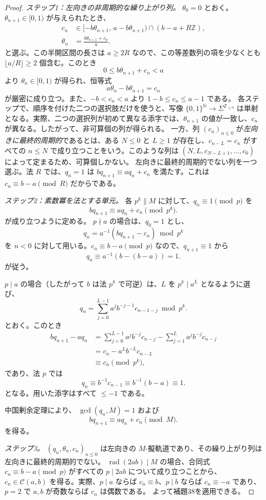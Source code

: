\documentclass[11pt,reqno]{amsart}
\theoremstyle{definition}
\theoremstyle{definition}
\theoremstyle{remark}
\begin{document}
\begin{proof}\leavevmode\label{proof:39}
\emph{ステップ1：左向きの非周期的な繰り上がり列。} \(\theta_0=0\) とおく。\(\theta_{n+1}\in[0,1)\) が与えられたとき、
\[
\begin{aligned}
c_n&\in[-b\theta_{n+1},\,a-b\theta_{n+1})\cap(b-a+R\mathbb Z),\\
\theta_n&=\frac{b\theta_{n+1}+c_n}{a}.
\end{aligned}
\]
と選ぶ。この半開区間の長さは \(a\ge2R\) なので、この等差数列の項を少なくとも \(\lfloor a/R\rfloor\ge2\) 個含む。このとき
\[
0\le b\theta_{n+1}+c_n<a
\]
より \(\theta_n\in[0,1)\) が得られ、恒等式
\[
a\theta_n-b\theta_{n+1}=c_n
\]
が厳密に成り立つ。また、\(-b<c_n<a\) より \(1-b\le c_n\le a-1\) である。
各ステップで、順序を付けた二つの選択肢だけを使うと、写像 \(\{0,1\}^{\mathbb N}\to\Sigma^{\mathbb Z_{\le0}}\) は単射となる。実際、二つの選択列が初めて異なる添字では、\(\theta_{n+1}\) の値が一致し、\(c_n\) が異なる。したがって、非可算個の列が得られる。
一方、列 \((c_n)_{n\le0}\) が\emph{左向きに最終的周期的}であるとは、ある \(N\le0\) と \(L\ge1\) が存在し、\(c_{n-L}=c_n\) がすべての \(n\le N\) で成り立つことをいう。このような列は \((N,L,c_{N-L+1},\ldots,c_0)\) によって定まるため、可算個しかない。
左向きに最終的周期的でない列を一つ選ぶ。法 \(R\) では、\(q_n=1\) は \(bq_{n+1}\equiv aq_n+c_n\) を満たす。これは \(c_n\equiv b-a\pmod R\) だからである。

\emph{ステップ2：素数冪を法とする単元。} 各 \(p^k\parallel M\) に対して、\(q_n\equiv1\pmod p\) を
\[
bq_{n+1}\equiv aq_n+c_n\pmod{p^k}.
\]
が成り立つように定める。
\(p\nmid a\) の場合は、\(q_0=1\) とし、
\[
q_n=a^{-1}(bq_{n+1}-c_n)\bmod p^k
\]
を \(n<0\) に対して用いる。\(c_n\equiv b-a\pmod p\) なので、\(q_{n+1}\equiv1\) から
\[
q_n\equiv a^{-1}(b-(b-a))=1.
\]
が従う。

\(p\mid a\) の場合（したがって \(b\) は法 \(p^k\) で可逆）は、\(L\) を \(p^k\mid a^L\) となるように選び、
\[
q_n=\sum_{j=0}^{L-1}a^jb^{-j-1}c_{n-1-j}\bmod p^k.
\]
とおく。このとき
\[
\begin{aligned}
bq_{n+1}-aq_n&=\sum_{j=0}^{L-1}a^jb^{-j}c_{n-j}-\sum_{j=1}^{L}a^jb^{-j}c_{n-j}\\
&=c_n-a^Lb^{-L}c_{n-L}\\
&\equiv c_n\pmod{p^k},
\end{aligned}
\]
であり、法 \(p\) では
\[
q_n\equiv b^{-1}c_{n-1}\equiv b^{-1}(b-a)\equiv1.
\]
となる。用いた添字はすべて \(\le-1\) である。

中国剰余定理により、
\(\gcd(q_n,M)=1\)
および
\[
bq_{n+1}\equiv aq_n+c_n\pmod M.
\]
を得る。

\emph{ステップ3。} \((q_n,\theta_n,c_n)_{n\le0}\) は左向きの \(M\)-擬軌道であり、その繰り上がり列は左向きに最終的周期的でない。
\(\operatorname{rad}(2ab)\mid M\) の場合、合同式 \(c_n\equiv b-a\pmod p\) がすべての \(p\mid2ab\) について成り立つことから、\(c_n\in\mathcal C(a,b)\) を得る。実際、\(p\mid a\) ならば \(c_n\equiv b\)、\(p\mid b\) ならば \(c_n\equiv-a\) であり、\(p=2\) で \(a,b\) が奇数ならば \(c_n\) は偶数である。
よって補題38を適用できる。\qedhere
\end{proof}
\end{document}
